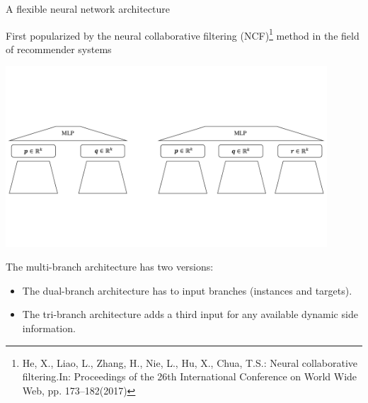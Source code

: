 \documentclass[]{beamer}
\begin{document}
\begin{frame}{A flexible neural network architecture}

First popularized by the neural  collaborative  filtering  (NCF)\footnote{ He, X., Liao, L., Zhang, H., Nie, L., Hu, X., Chua, T.S.: Neural collaborative filtering.In: Proceedings of the 26th International Conference on World Wide Web, pp. 173–182(2017)}  method  in  the  field  of  recommender systems

\begin{center}
\includegraphics[width=0.9\textwidth,trim = 0 160 0 170,clip]{Dimitris_figures/dual_triple_branch_architecture.pdf}
\end{center}
 
The multi-branch architecture has two versions:
\begin{itemize}
\item[1.] The dual-branch architecture has to input branches (instances and targets).
\item[2.] The tri-branch architecture adds a third input for any available dynamic side information.
\end{itemize}

\end{frame}
\end{document}
